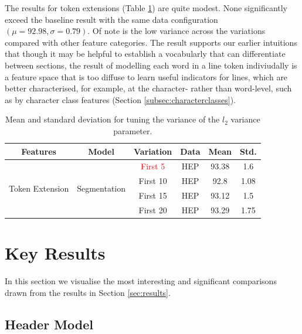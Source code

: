 The results for token extensions (Table \ref{table:tokenextensions}) are quite modest. None significantly exceed the baseline result with the same data configuration $(\mu = 92.98, \sigma = 0.79)$. Of note is the low variance across the variations compared with other feature categories. The result supports our earlier intuitions that though it may be helpful to establish a vocabularly that can differentiate between sections, the result of modelling each word in a line token indiviudally is a feature space that is too diffuse to learn useful indicators for lines, which are better characterised, for example, at the character- rather than word-level, such as by character class features (Section \ref{subsec:characterclasses}).

\begin{table}[h]
\begin{center}
\begin{tabular}{|c|c|c|c|c|c|}
\hline
Features & Model & Variation & Data & Mean & Std.\\
\hline
\multirow{4}{*}{Token Extension} & \multirow{4}{*}{Segmentation} & \textcolor{red}{First 5} & HEP & 93.38 & 1.6\\\cline{3-6}
& & First 10 & HEP & 92.8 & 1.08\\\cline{3-6}
& & First 15 & HEP & 93.12 & 1.5\\\cline{3-6}
& & First 20 & HEP & 93.29 & 1.75\\\cline{3-6}
\hline
\end{tabular}
\caption[Mean and standard deviation for tuning the variance of the $l_2$ variance parameter.]{Mean and standard deviation for tuning the variance of the $l_2$ variance parameter.}
\label{table:tokenextensions}
\end{center}
\end{table}

\section{Key Results}
\label{sec:keyresults}

In this section we visualise the most interesting and significant comparisons drawn from the results in Section \ref{sec:results}.

\subsection{Header Model}

